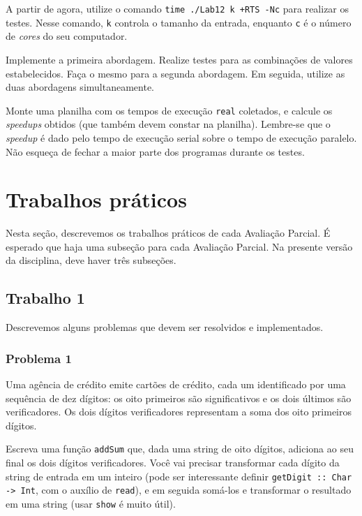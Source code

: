 \documentclass[a4paper]{article}
\begin{document}
A partir de agora, utilize o comando \texttt{time ./Lab12 k +RTS -Nc} para realizar os testes.
Nesse comando, \texttt{k} controla o tamanho da entrada, enquanto \texttt{c} é o
número de \emph{cores} do seu computador.

Implemente a primeira abordagem.
Realize testes para as combinações de valores estabelecidos.
Faça o mesmo para a segunda abordagem.
Em seguida, utilize as duas abordagens simultaneamente.

Monte uma planilha com os tempos de execução \texttt{real} coletados, e calcule
os \emph{speedups} obtidos (que também devem constar na planilha).
Lembre-se que o \emph{speedup} é dado pelo tempo de execução serial sobre o
tempo de execução paralelo.
Não esqueça de fechar a maior parte dos programas durante os testes.

\pagebreak

\section{Trabalhos práticos}

Nesta seção, descrevemos os trabalhos práticos de cada Avaliação Parcial.
É esperado que haja uma subseção para cada Avaliação Parcial.
Na presente versão da disciplina, deve haver três subseções.

\subsection{Trabalho 1}

Descrevemos alguns problemas que devem ser resolvidos e implementados.

\subsubsection{Problema 1}

Uma agência de crédito emite cartões de crédito, cada um identificado por uma sequência de dez dígitos: os oito primeiros são significativos e os dois últimos são verificadores.
Os dois dígitos verificadores representam a soma dos oito primeiros dígitos.

Escreva uma função \texttt{addSum} que, dada uma string de oito dígitos, adiciona ao seu final os dois dígitos verificadores.
Você vai precisar transformar cada dígito da string de entrada em um inteiro (pode ser interessante definir \texttt{getDigit :: Char -> Int}, com o auxílio de \texttt{read}), e em seguida somá-los e transformar o resultado em uma string (usar \texttt{show} é muito útil).
\end{document}
